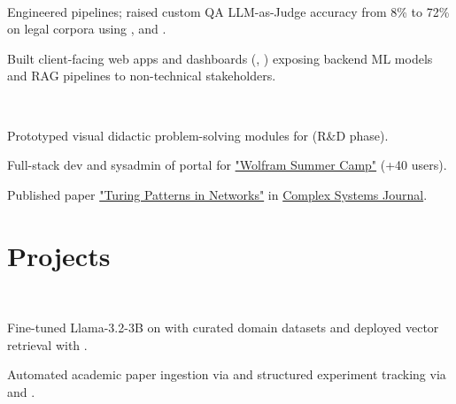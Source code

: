 \documentclass{tex/deedy-resume-openfont}
\begin{document}
\begin{minipage}[t]{0.67\textwidth}
\\
\begin{tightemize}
    \item Engineered  pipelines; raised custom QA LLM-as-Judge accuracy from 8\% to 72\% on legal corpora using ,  and .
    \item Built client-facing web apps and dashboards (, ) exposing backend ML models and RAG pipelines to non-technical stakeholders.
\end{tightemize}
\sectionsep

\\
\begin{tightemize}
    \item Prototyped visual didactic problem-solving modules for  (R\&D phase).
    \item Full-stack dev and sysadmin of portal for \href{https://www.notebookarchive.org/collection-pod?collection=wolfram-summer-school-2021}{"Wolfram Summer Camp"} (+40 users).
    \item Published paper \href{https://www.complex-systems.com/abstracts/v32_i03_a02/}{"Turing Patterns in Networks"} in \href{https://www.complex-systems.com/}{Complex Systems Journal}.
\end{tightemize}


\section{Projects}

\\
\begin{tightemize}
    \item Fine-tuned Llama-3.2-3B on  with curated domain datasets and deployed vector retrieval with .
    \item Automated academic paper ingestion via  and structured experiment tracking via  and .
\end{tightemize}
\sectionsep


\end{minipage}
\end{document}

